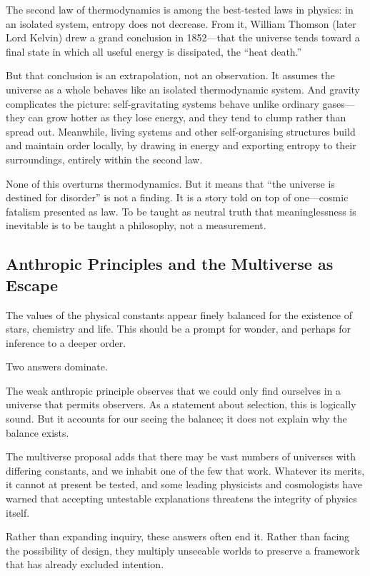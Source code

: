 \documentclass[11pt,a4paper]{article}
\begin{document}
The second law of thermodynamics is among the best-tested laws in physics: in an isolated system, entropy does not decrease. From it, William Thomson (later Lord Kelvin) drew a grand conclusion in 1852---that the universe tends toward a final state in which all useful energy is dissipated, the ``heat death.''

But that conclusion is an extrapolation, not an observation. It assumes the universe as a whole behaves like an isolated thermodynamic system. And gravity complicates the picture: self-gravitating systems behave unlike ordinary gases---they can grow hotter as they lose energy, and they tend to clump rather than spread out. Meanwhile, living systems and other self-organising structures build and maintain order locally, by drawing in energy and exporting entropy to their surroundings, entirely within the second law.

None of this overturns thermodynamics. But it means that ``the universe is destined for disorder'' is not a finding. It is a story told on top of one---cosmic fatalism presented as law. To be taught as neutral truth that meaninglessness is inevitable is to be taught a philosophy, not a measurement.

\subsection{Anthropic Principles and the Multiverse as Escape}

The values of the physical constants appear finely balanced for the existence of stars, chemistry and life. This should be a prompt for wonder, and perhaps for inference to a deeper order.

Two answers dominate.

The weak anthropic principle observes that we could only find ourselves in a universe that permits observers. As a statement about selection, this is logically sound. But it accounts for our seeing the balance; it does not explain why the balance exists.

The multiverse proposal adds that there may be vast numbers of universes with differing constants, and we inhabit one of the few that work. Whatever its merits, it cannot at present be tested, and some leading physicists and cosmologists have warned that accepting untestable explanations threatens the integrity of physics itself.

Rather than expanding inquiry, these answers often end it. Rather than facing the possibility of design, they multiply unseeable worlds to preserve a framework that has already excluded intention.
\end{document}
